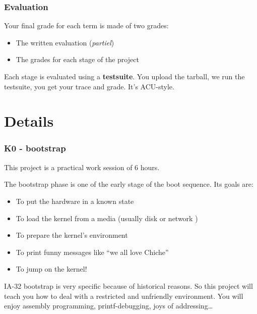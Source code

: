 {%

\begin{frame}
  \frametitle{Evaluation}

  Your final grade for each term is made of two grades:

  \begin{itemize}
  \item
    The written evaluation (\emph{partiel})
  \item
    The grades for each stage of the project
  \end{itemize}

  \-

  Each stage is evaluated using a \textbf{testsuite}. You upload the
  tarball, we run the testsuite, you get your trace and grade. It's
  ACU-style.

\end{frame}

%
%

\section{Details}


\begin{frame}
  \frametitle{K0 - bootstrap}

  This project is a practical work session of 6 hours.

  \-

  The bootstrap phase is one of the early stage of the boot
  sequence. Its goals are:

  \begin{itemize}
  \item
    To put the hardware in a known state
  \item
    To load the kernel from a media (usually disk or network )
  \item
    To prepare the kernel's environment
  \item
    To print funny messages like ``we all love Chiche''
  \item
    To jump on the kernel!
  \end{itemize}

  \-

  IA-32 bootstrap is very specific because of historical reasons. So
  this project will teach you how to deal with a restricted and
  unfriendly environment. You will enjoy assembly programming,
  printf-debugging, joys of addressing\ldots

\end{frame}

}
